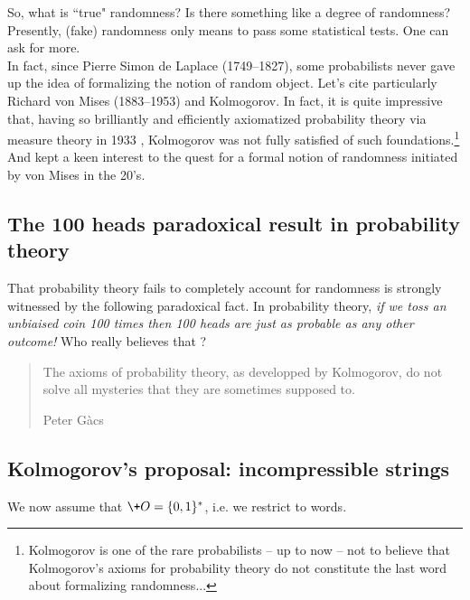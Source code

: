 So, what is ``true" randomness?
Is there something like a degree of randomness?
Presently, (fake) randomness only means to pass
some statistical tests.
One can ask for more.
\\
In fact, since Pierre Simon de Laplace (1749--1827),
some probabilists never gave up the idea of formalizing
the notion of random object.
Let's cite particularly Richard von Mises (1883--1953)
and Kolmogorov.
In fact, it is quite impressive that, having so brilliantly
and efficiently axiomatized probability theory via measure theory
in 1933 \cite{kolmo33}, Kolmogorov was not fully satisfied
of such foundations.\footnote{
Kolmogorov is one of the rare probabilists -- up to now --
not to believe that Kolmogorov's axioms for probability theory
do not constitute the last word about formalizing randomness...}
And kept a keen interest to the quest for a formal
notion of randomness initiated by von Mises in the 20's.
\subsection{The 100 heads paradoxical result in probability theory}
That probability theory fails to completely account for randomness
is strongly witnessed by the following paradoxical fact.
In probability theory,
{\em if we toss an unbiaised coin 100 times then
       100 heads are just as probable as any other outcome!}
Who really believes that ?
{\em\begin{quote}
The axioms of probability theory, as developped by Kolmogorov,
do not solve all mysteries that they are sometimes supposed to.

\hfill{Peter G\`acs \cite{gacs93}}
\end{quote}}

\subsection{Kolmogorov's proposal: incompressible strings}
We now assume that $\+O={\{0,1\}^*}$, i.e. we restrict to words.
